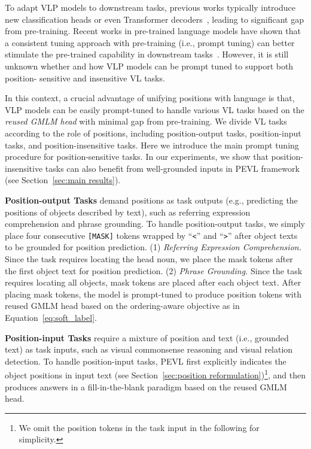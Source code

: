 \documentclass[11pt]{article}
\begin{document}
To adapt VLP models to downstream tasks, previous works typically introduce new classification heads or even Transformer decoders~\cite{kamath2021mdetr,li2021align,chen2020uniter}, leading to significant gap from pre-training. Recent works in pre-trained language models have shown that a consistent tuning approach with pre-training (i.e., prompt tuning) can better stimulate the pre-trained capability in downstream tasks~\cite{schick-schutze-2021-just,gao2021making,liu2021pre}. However, it is still unknown whether and how VLP models can be prompt tuned to support both position- sensitive and insensitive VL tasks.

In this context, a crucial advantage of unifying positions with language is that, VLP models can be easily prompt-tuned to handle various VL tasks based on the \textit{reused GMLM head} with minimal gap from pre-training. We divide VL tasks according to the role of positions, including position-output tasks, position-input tasks, and position-insensitive tasks. Here we introduce the main prompt tuning procedure for position-sensitive tasks. In our experiments, we show that position-insensitive tasks can also benefit from well-grounded inputs in PEVL framework (see Section~\ref{sec:main results}). 


\smallskip
\textbf{Position-output Tasks} demand positions as task outputs (e.g., predicting the positions of objects described by text), such as referring expression comprehension and phrase grounding. To handle position-output tasks, we simply place four consecutive \texttt{[MASK]} tokens wrapped by ``\texttt{<}'' and ``\texttt{>}'' after object texts to be grounded for position prediction. (1) \textit{Referring Expression Comprehension.} Since the task requires locating the head noun, we place the mask tokens after the first object text for position prediction. (2) \textit{Phrase Grounding.} Since the task requires locating all objects, mask tokens are placed after each object text. After placing mask tokens, the model is prompt-tuned to produce position tokens with reused GMLM head based on the ordering-aware objective as in Equation~\ref{eq:soft_label}.

\smallskip
\textbf{Position-input Tasks} require a mixture of position and text (i.e., grounded text) as task inputs, such as visual commonsense reasoning and visual relation detection. To handle position-input tasks, PEVL first explicitly indicates the object positions in input text (see Section~\ref{sec:position reformulation})\footnote{We omit the position tokens in the task input in the following for simplicity.}, and then produces answers in a fill-in-the-blank paradigm based on the reused GMLM head. 
\end{document}
